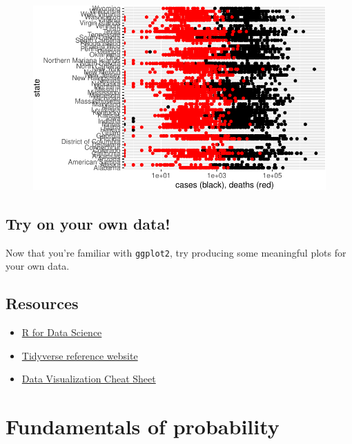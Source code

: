 \documentclass[
  letterpaper,
  DIV=11,
  numbers=noendperiod]{scrreprt}
\providecommand{\tightlist}{%
  \setlength{\itemsep}{0pt}\setlength{\parskip}{0pt}}\usepackage{longtable,booktabs,array}
\begin{document}
\begin{figure}[H]

{\centering \includegraphics{./01-dataviz_files/figure-pdf/unnamed-chunk-28-1.pdf}

}

\end{figure}

\hypertarget{try-on-your-own-data}{%
\section{Try on your own data!}\label{try-on-your-own-data}}

Now that you're familiar with \texttt{ggplot2}, try producing some
meaningful plots for your own data.

\hypertarget{resources-1}{%
\section{Resources}\label{resources-1}}

\begin{itemize}
\tightlist
\item
  \href{https://hackr.io/tutorial/r-for-data-science}{R for Data
  Science}
\item
  \href{https://www.tidyverse.org/}{Tidyverse reference website}
\item
  \href{https://github.com/rstudio/cheatsheets/raw/master/data-visualization-2.1.pdf}{Data
  Visualization Cheat Sheet}
\end{itemize}


\hypertarget{fundamentals-of-probability}{%
\chapter{Fundamentals of
probability}\label{fundamentals-of-probability}}
\end{document}
